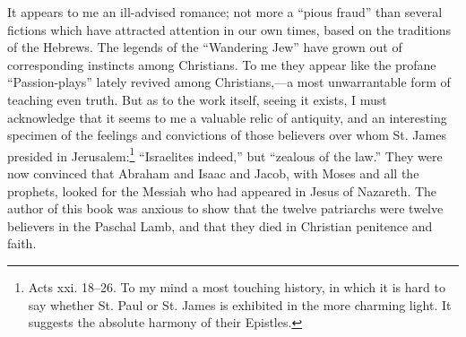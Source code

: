 It appears to me an ill-advised romance; not more a “pious fraud” than several fictions which have attracted attention in our own times, based on the traditions of the Hebrews. The legends of the “Wandering Jew” have grown out of corresponding instincts among Christians. To me they appear like the profane “Passion-plays” lately revived among Christians,—a most unwarrantable form of teaching even truth. But as to the work itself, seeing it exists, I must acknowledge that it seems to me a valuable relic of antiquity, and an interesting specimen of the feelings and convictions of those believers over whom St. James presided in Jerusalem:\footnote{Acts xxi. 18–26. To my mind a most touching history, in which it is hard to say whether St. Paul or St. James is exhibited in the more charming light. It suggests the absolute harmony of their Epistles.} “Israelites indeed,” but “zealous of the law.” They were now convinced that Abraham and Isaac and Jacob, with Moses and all the prophets, looked for the Messiah who had appeared in Jesus of Nazareth. The author of this book was anxious to show that the twelve patriarchs were twelve believers in the Paschal Lamb, and that they died in Christian penitence and faith.

